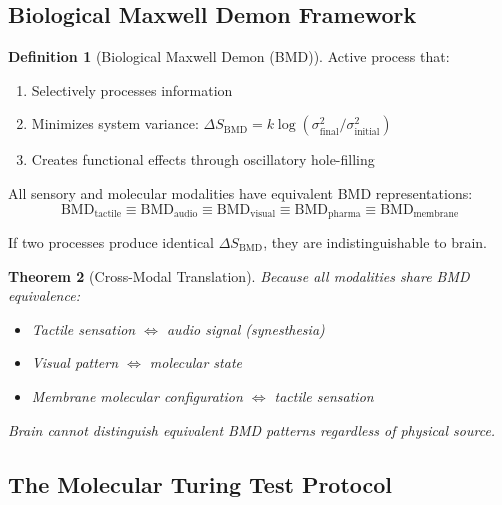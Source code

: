 \documentclass[11pt,a4paper]{article}
\newtheorem{theorem}{Theorem}[section]
\theoremstyle{definition}
\newtheorem{definition}[theorem]{Definition}
\theoremstyle{remark}
\begin{document}
\subsection{Biological Maxwell Demon Framework}

\begin{definition}[Biological Maxwell Demon (BMD)]
Active process that:
\begin{enumerate}
\item Selectively processes information
\item Minimizes system variance: $\Delta S_{\text{BMD}} = k \log(\sigma^2_{\text{final}}/\sigma^2_{\text{initial}})$
\item Creates functional effects through oscillatory hole-filling
\end{enumerate}
\end{definition}

\begin{axiom}
All sensory and molecular modalities have equivalent BMD representations:
\begin{equation}
\text{BMD}_{\text{tactile}} \equiv \text{BMD}_{\text{audio}} \equiv \text{BMD}_{\text{visual}} \equiv \text{BMD}_{\text{pharma}} \equiv \text{BMD}_{\text{membrane}}
\end{equation}

If two processes produce identical $\Delta S_{\text{BMD}}$, they are indistinguishable to brain.
\end{axiom}

\begin{theorem}[Cross-Modal Translation]
Because all modalities share BMD equivalence:
\begin{itemize}
\item Tactile sensation $\Leftrightarrow$ audio signal (synesthesia)
\item Visual pattern $\Leftrightarrow$ molecular state
\item Membrane molecular configuration $\Leftrightarrow$ tactile sensation
\end{itemize}

Brain cannot distinguish equivalent BMD patterns regardless of physical source.
\end{theorem}

\subsection{The Molecular Turing Test Protocol}
\end{document}
